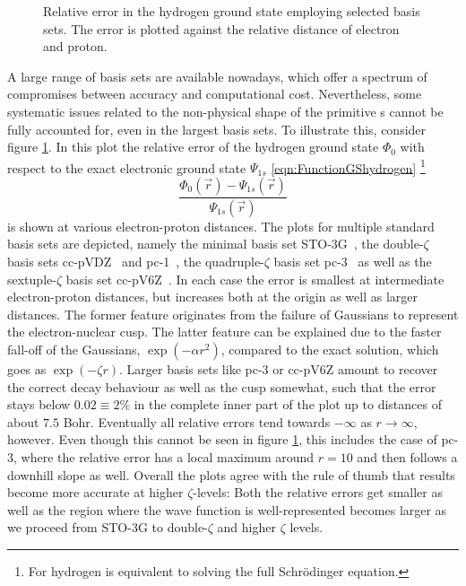 \begin{figure}
	\centering
	\caption[Relative error in the hydrogen \HF ground state
		for selected \cGTO bases]
	{Relative error in the hydrogen \HF ground state
		employing selected \cGTO basis sets.
		The error is plotted against
		the relative distance of electron and proton.
	}
	\label{fig:RelativeErrorCgto}
\end{figure}
A large range of \cGTO basis sets are available nowadays,
which offer a spectrum of compromises between accuracy and computational cost.
Nevertheless, some systematic issues related to the non-physical shape
of the primitive {\GTO}s cannot be fully accounted for,
even in the largest basis sets.
To illustrate this, consider figure \ref{fig:RelativeErrorCgto}.
In this plot the
relative error of the hydrogen \HF ground state $\Phi_0$
with respect to the exact
electronic ground state $\Psi_{1s}$ \eqref{eqn:FunctionGShydrogen}%
\footnote{For hydrogen \HF is equivalent to solving the full Schrödinger equation.}
\[ \frac{\Phi_0(\vec{r}) - \Psi_{1s}(\vec{r})}{\Psi_{1s}(\vec{r})} \]
is shown at various electron-proton distances.
The plots for multiple standard \cGTO basis sets are depicted,
namely the minimal basis set STO-3G~\cite{Hehre1969},
the double-$\zeta$ basis sets cc-pVDZ~\cite{Dunning1989}
and pc-1~\cite{Jensen2001},
the quadruple-$\zeta$ basis set pc-3~\cite{Jensen2001}
as well as the sextuple-$\zeta$ basis set cc-pV6Z~\cite{Wilson1996}.
In each case the error is smallest at intermediate
electron-proton distances, but increases both at the origin
as well as larger distances.
The former feature originates from the failure of Gaussians
to represent the electron-nuclear cusp.
The latter feature can be explained due to the faster fall-off
of the Gaussians, $\exp(-\alpha r^2)$,
compared to the exact solution,
which goes as $\exp(-\zeta r)$.
Larger basis sets like pc-3 or cc-pV6Z amount to recover the
correct decay behaviour as well as the cusp somewhat,
such that the error stays below $0.02 \equiv 2\%$
in the complete inner part of the plot up to distances
of about $7.5$ Bohr.
Eventually all relative errors tend towards $-\infty$ as $r \to \infty$,
however.
Even though this cannot be seen in figure \ref{fig:RelativeErrorCgto},
this includes the case of pc-3,
where the relative error has a local maximum around $r = 10$
and then follows a downhill slope as well.
Overall the plots agree with the rule of thumb
that results become more accurate at higher $\zeta$-levels:
Both the relative errors get smaller as well as the region
where the wave function is well-represented becomes larger
as we proceed from STO-3G to double-$\zeta$ and higher $\zeta$ levels.

